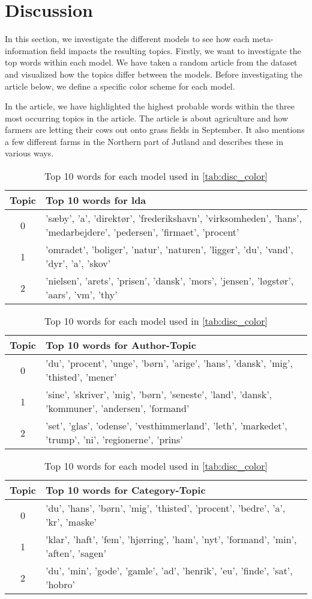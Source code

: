 \section{Discussion}\label{sec:discussion}
In this section, we investigate the different models to see how each meta-information field impacts the resulting topics.
Firstly, we want to investigate the top words within each model.
We have taken a random article from the dataset and visualized how the topics differ between the models. 
Before investigating the article below, we define a specific color scheme for each model.

In the article, we have highlighted the highest probable words within the three most occurring topics in the article.
The article is about agriculture and how farmers are letting their cows out onto grass fields in September. 
It also mentions a few different farms in the Northern part of Jutland and describes these in various ways.

\begin{table}
	\begin{tabular}{c|p{}}
		Topic & Top 10 words for \gls{lda} \\
		\toprule
		0 & 'sæby', 'a', 'direktør', 'frederikshavn', 'virksomheden', 'hans', 'medarbejdere', 'pedersen', 'firmaet', 'procent' \\
		1 & 'omradet', 'boliger', 'natur', 'naturen', 'ligger', 'du', 'vand', 'dyr', 'a', 'skov' \\
		2 & 'nielsen', 'arets', 'prisen', 'dansk', 'mors', 'jensen', 'løgstør', 'aars', 'vm', 'thy' \\
	\end{tabular}
	\begin{tabular}{c|p{}}
		Topic & Top 10 words for Author-Topic \\
		\toprule
		0 & 'du', 'procent', 'unge', 'børn', 'arige', 'hans', 'dansk', 'mig', 'thisted', 'mener'\\
		1 & 'sine', 'skriver', 'mig', 'børn', 'seneste', 'land', 'dansk', 'kommuner', 'andersen', 'formand' \\
		2 & 'set', 'glas', 'odense', 'vesthimmerland', 'leth', 'markedet', 'trump', 'ni', 'regionerne', 'prins'\\
	\end{tabular}
	\begin{tabular}{c|p{}}
		Topic & Top 10 words for Category-Topic \\
		\toprule
		0 & 'du', 'hans', 'børn', 'mig', 'thisted', 'procent', 'bedre', 'a', 'kr', 'maske' \\
		1 & 'klar', 'haft', 'fem', 'hjørring', 'ham', 'nyt', 'formand', 'min', 'aften', 'sagen'\\
		2 & 'du', 'min', 'gode', 'gamle', 'ad', 'henrik', 'eu', 'finde', 'sat', 'hobro'\\
	\end{tabular}
	\caption{Top 10 words for each model used in \autoref{tab:disc_color}}
	\label{tab:top_words_three_models}
\end{table}

